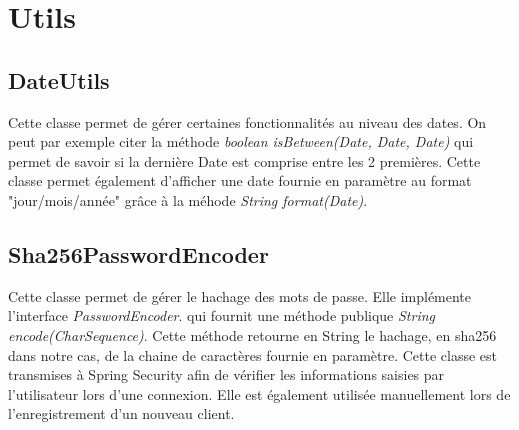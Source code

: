 	\section{Utils}

		\subsection{DateUtils}

			Cette classe permet de gérer certaines fonctionnalités au niveau des dates. On peut par exemple citer la méthode \textit{boolean isBetween(Date, Date, Date)} qui permet de savoir si la dernière Date est comprise entre les 2 premières. Cette classe permet également d'afficher une date fournie en paramètre au format "jour/mois/année" grâce à la méhode \textit{String format(Date)}.

		\subsection{Sha256PasswordEncoder}
			\label{subsec:Sha256PasswordEncoder}

			Cette classe permet de gérer le hachage des mots de passe. Elle implémente l'interface \textit{PasswordEncoder}. qui fournit une méthode publique \textit{String encode(CharSequence)}. Cette méthode retourne en String le hachage, en sha256 dans notre cas, de la chaine de caractères fournie en paramètre. Cette classe est transmises à Spring Security afin de vérifier les informations saisies par l'utilisateur lors d'une connexion. Elle est également utilisée manuellement lors de l'enregistrement d'un nouveau client.
